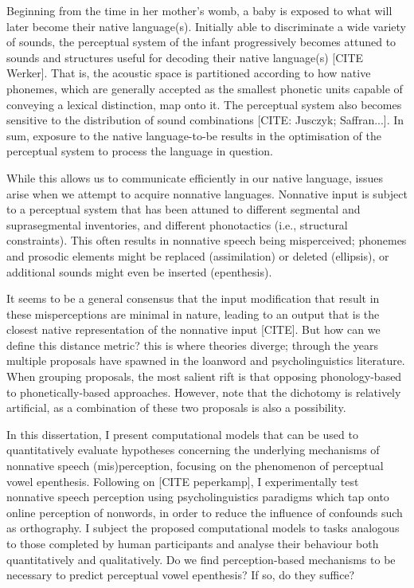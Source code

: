 

Beginning from the time in her mother's womb, a baby is exposed to what will later become their native language(s). Initially able to discriminate a wide variety of sounds, the perceptual system of the infant progressively becomes attuned to sounds and structures useful for decoding their native language(s) [CITE Werker]. That is, the acoustic space is partitioned according to how native phonemes, which are generally accepted as the smallest phonetic units capable of conveying a lexical distinction, map onto it. The perceptual system also becomes sensitive to the distribution of sound combinations [CITE: Jusczyk; Saffran...]. In sum, exposure to the native language-to-be results in the optimisation of the perceptual system to process the language in question.

While this allows us to communicate efficiently in our native language, issues arise when we attempt to acquire nonnative languages. Nonnative input is subject to a perceptual system that has been attuned to different segmental and suprasegmental inventories, and different phonotactics (i.e., structural constraints). This often results in nonnative speech being misperceived; phonemes and prosodic elements might be replaced (assimilation) or deleted (ellipsis), or additional sounds might even be inserted (epenthesis).

It seems to be a general consensus that the input modification that result in these misperceptions are minimal in nature, leading to an output that is the closest native representation of the nonnative input [CITE]. But how can we define this distance metric? this is where theories diverge; through the years multiple proposals have spawned in the loanword and psycholinguistics literature. When grouping proposals, the most salient rift is that opposing phonology-based to phonetically-based approaches. However, note that the dichotomy is relatively artificial, as a combination of these two proposals is also a possibility.

In this dissertation, I present computational models that can be used to quantitatively evaluate hypotheses concerning the underlying mechanisms of nonnative speech (mis)perception, focusing on the phenomenon of perceptual vowel epenthesis. Following on [CITE peperkamp], I experimentally test nonnative speech perception using psycholinguistics paradigms which tap onto online perception of nonwords, in order to reduce the influence of confounds such as orthography. I subject the proposed computational models to tasks analogous to those completed by human participants and analyse their behaviour both quantitatively and qualitatively. Do we find perception-based mechanisms to be necessary to predict perceptual vowel epenthesis? If so, do they suffice? 


